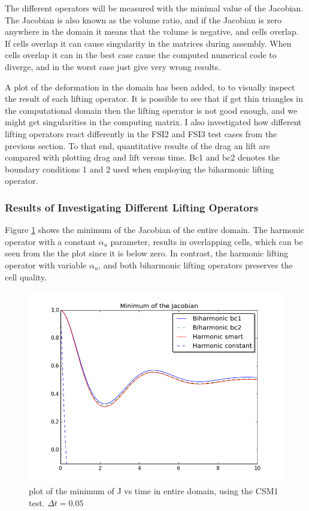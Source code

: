 The different operators will be measured with the minimal value of the Jacobian. The Jacobian is also known as the volume ratio, and if the Jacobian is zero anywhere in the domain it means that the volume is negative, and cells overlap. If cells overlap it can cause singularity in the matrices during assembly. When cells overlap it can in the best case cause the computed numerical code to diverge, and in the worst case just give very wrong results. \newline

A plot of the deformation in the domain has been added, to to visually inspect the result of each lifting operator. It is possible to see that if get thin triangles in the computational domain then the lifting operator is not good enough, and we might get singularities in the computing matrix.
I also investigated how different lifting operators react differently in the FSI2 and FSI3 test cases from the previous section. To that end, quantitative results of the drag an lift are compared with plotting drag and lift versus time. Bc1 and bc2 denotes the boundary conditions 1 and 2 used when employing the biharmonic lifting operator.


\subsubsection*{Results of Investigating Different Lifting Operators}
Figure \ref{fig:fluid_structure} shows the minimum of the Jacobian of the entire domain. The harmonic operator with a constant $\alpha_u$ parameter, results in overlapping cells, which can be seen from the the plot since it is below zero. In contrast, the harmonic lifting operator with variable $\alpha_u$, and both biharmonic lifting operators preserves the cell quality.

\begin{figure}[H]
  \label{fig:fluid_structure}
  \includegraphics[scale=0.60, trim={0mm 0mm 0mm 0mm},clip]{./Mesh_motion_results/CSM1.png}
   \caption{plot of the minimum of J vs time in entire domain, using the CSM1 test. $\Delta t = 0.05$}
\end{figure}

